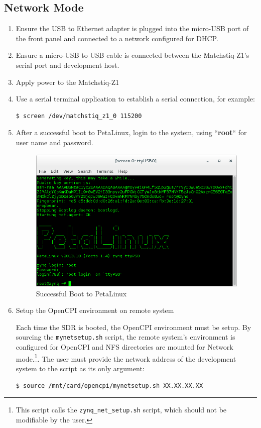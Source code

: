 \subsection{Network Mode}
\begin{enumerate}
\item Ensure the USB to Ethernet adapter is plugged into the micro-USB port of the front panel and connected to a network configured for DHCP.
\item Ensure a micro-USB to USB cable is connected between the Matchstiq-Z1's serial port and development host.
\item Apply power to the Matchstiq-Z1
\item Use a serial terminal application to establish a serial connection, for example:
\begin{verbatim}
$ screen /dev/matchstiq_z1_0 115200
\end{verbatim} \medskip

\item After a successful boot to PetaLinux, login to the system, using  ``\textbf{root}`` for user name and password.

\begin{figure}[H]
	\centerline{\includegraphics[scale=0.5]{Matchstiq_Z1_login}}
	\caption{Successful Boot to PetaLinux}
	\label{fig:boot1}
\end{figure}

\item Setup the OpenCPI environment on remote system

\begin{flushleft}
Each time the SDR is booted, the OpenCPI environment must be setup. By sourcing the \texttt{mynetsetup.sh} script, the remote system's environment is configured for OpenCPI and NFS directories are mounted for Network mode.\footnote{This script calls the \texttt{zynq\_net\_setup.sh} script, which should not be modifiable by the user.}. The user must provide the network address of the development system to the script as its only argument:
\begin{verbatim}
$ source /mnt/card/opencpi/mynetsetup.sh XX.XX.XX.XX
\end{verbatim} \medskip


\end{flushleft}
\end{enumerate}
